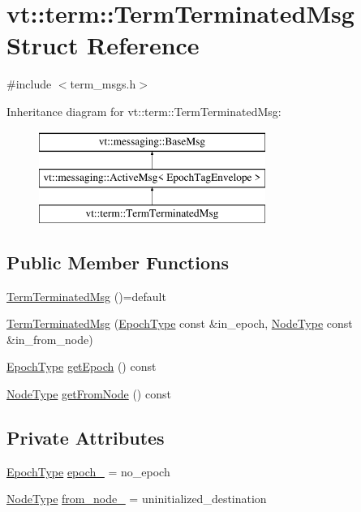 \hypertarget{structvt_1_1term_1_1_term_terminated_msg}{}\section{vt\+:\+:term\+:\+:Term\+Terminated\+Msg Struct Reference}
\label{structvt_1_1term_1_1_term_terminated_msg}


{\ttfamily \#include $<$term\+\_\+msgs.\+h$>$}

Inheritance diagram for vt\+:\+:term\+:\+:Term\+Terminated\+Msg\+:\begin{figure}[H]
\begin{center}
\leavevmode
\includegraphics[height=3.000000cm]{structvt_1_1term_1_1_term_terminated_msg}
\end{center}
\end{figure}
\subsection*{Public Member Functions}
\begin{DoxyCompactItemize}
\item 
\hyperlink{structvt_1_1term_1_1_term_terminated_msg_aa4d8ff658de9fb4bca91ea687e4ebd9f}{Term\+Terminated\+Msg} ()=default
\item 
\hyperlink{structvt_1_1term_1_1_term_terminated_msg_a067b9cd70d084bb0767c41c8eb05aa29}{Term\+Terminated\+Msg} (\hyperlink{namespacevt_a985a5adf291c34a3ca263b3378388236}{Epoch\+Type} const \&in\+\_\+epoch, \hyperlink{namespacevt_a866da9d0efc19c0a1ce79e9e492f47e2}{Node\+Type} const \&in\+\_\+from\+\_\+node)
\item 
\hyperlink{namespacevt_a985a5adf291c34a3ca263b3378388236}{Epoch\+Type} \hyperlink{structvt_1_1term_1_1_term_terminated_msg_a9008729d246d7cde6ce7b5dfb2dfa204}{get\+Epoch} () const
\item 
\hyperlink{namespacevt_a866da9d0efc19c0a1ce79e9e492f47e2}{Node\+Type} \hyperlink{structvt_1_1term_1_1_term_terminated_msg_a61ee025b8d4918e81bee601a4e7a2c3d}{get\+From\+Node} () const
\end{DoxyCompactItemize}
\subsection*{Private Attributes}
\begin{DoxyCompactItemize}
\item 
\hyperlink{namespacevt_a985a5adf291c34a3ca263b3378388236}{Epoch\+Type} \hyperlink{structvt_1_1term_1_1_term_terminated_msg_ad10f7149ea1e887e040c01ddcc671e35}{epoch\+\_\+} = no\+\_\+epoch
\item 
\hyperlink{namespacevt_a866da9d0efc19c0a1ce79e9e492f47e2}{Node\+Type} \hyperlink{structvt_1_1term_1_1_term_terminated_msg_a393564a84f3a77e1ab7b31ee8c368d5b}{from\+\_\+node\+\_\+} = uninitialized\+\_\+destination
\end{DoxyCompactItemize}
